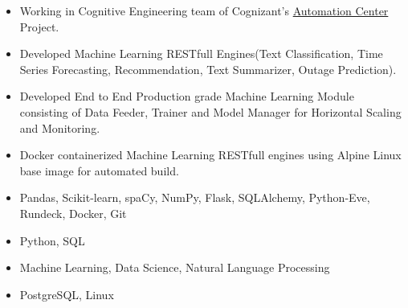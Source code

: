 \documentclass[10pt,a4paper,ragged2e]{altacv}
\begin{document}

\begin{fullwidth}
\makecvheader
\end{fullwidth}



\begin{itemize}
\item Working in Cognitive Engineering team of Cognizant’s \href{https://www.cognizant.com/automation-center}{Automation Center} Project.
\smallskip
\item Developed Machine Learning RESTfull Engines(Text Classification, Time Series Forecasting, Recommendation, Text Summarizer, Outage Prediction).
\smallskip
\item Developed End to End Production grade Machine Learning Module consisting of Data Feeder, Trainer and Model Manager for Horizontal Scaling and Monitoring.
\smallskip
\item Docker containerized Machine Learning RESTfull engines using Alpine Linux base image for automated build.
\end{itemize}

\smallskip
\begin{itemize}
\item Pandas, Scikit-learn, spaCy, NumPy, Flask, SQLAlchemy, Python-Eve, Rundeck, Docker, Git
\smallskip
\item Python, SQL
\smallskip
\item Machine Learning, Data Science, Natural Language Processing
\smallskip
\item PostgreSQL, Linux
\smallskip 
\end{itemize}
\end{document}

